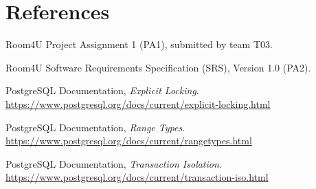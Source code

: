 
\section*{References}

\begin{description}[leftmargin=1.1cm,style=nextline]
  \item [P1] Room4U Project Assignment 1 (PA1), submitted by team T03.
  \item [P2] Room4U Software Requirements Specification (SRS), Version 1.0 (PA2).
  \item [R1] PostgreSQL Documentation, \emph{Explicit Locking}. \url{https://www.postgresql.org/docs/current/explicit-locking.html}
  \item [R2] PostgreSQL Documentation, \emph{Range Types}. \url{https://www.postgresql.org/docs/current/rangetypes.html}
  \item [R5] PostgreSQL Documentation, \emph{Transaction Isolation}. \url{https://www.postgresql.org/docs/current/transaction-iso.html}
\end{description}